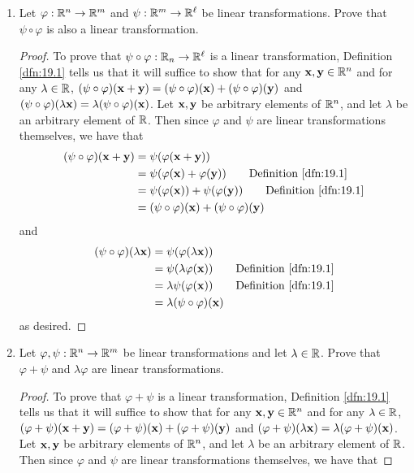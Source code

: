\documentclass[../main.tex]{subfiles}
\begin{document}
\begin{exercise}\label{exr:19.5}\leavevmode
    \begin{enumerate}[label={(\alph*)}]
        \item Let $\varphi:\mathbb{R}^n\to\mathbb{R}^m$ and $\psi:\mathbb{R}^m\to\mathbb{R}^\ell$ be linear transformations. Prove that $\psi\circ\varphi$ is also a linear transformation.
        \begin{proof}
            To prove that $\psi\circ\varphi:\mathbb{R}_n\to\mathbb{R}^\ell$ is a linear transformation, Definition \ref{dfn:19.1} tells us that it will suffice to show that for any $\mathbf{x},\mathbf{y}\in\mathbb{R}^n$ and for any $\lambda\in\mathbb{R}$, $(\psi\circ\varphi)(\mathbf{x}+\mathbf{y})=(\psi\circ\varphi)(\mathbf{x})+(\psi\circ\varphi)(\mathbf{y})$ and $(\psi\circ\varphi)(\lambda\mathbf{x})=\lambda(\psi\circ\varphi)(\mathbf{x})$. Let $\mathbf{x},\mathbf{y}$ be arbitrary elements of $\mathbb{R}^n$, and let $\lambda$ be an arbitrary element of $\mathbb{R}$. Then since $\varphi$ and $\psi$ are linear transformations themselves, we have that
            \begin{align*}
                (\psi\circ\varphi)(\x+\y) &= \psi(\varphi(\x+\y))\\
                &= \psi(\varphi(\x)+\varphi(\y))\tag*{Definition \ref{dfn:19.1}}\\
                &= \psi(\varphi(\x))+\psi(\varphi(\y))\tag*{Definition \ref{dfn:19.1}}\\
                &= (\psi\circ\varphi)(\x)+(\psi\circ\varphi)(\y)
            \end{align*}
            and
            \begin{align*}
                (\psi\circ\varphi)(\lambda\x) &= \psi(\varphi(\lambda\x))\\
                &= \psi(\lambda\varphi(\x))\tag*{Definition \ref{dfn:19.1}}\\
                &= \lambda\psi(\varphi(\x))\tag*{Definition \ref{dfn:19.1}}\\
                &= \lambda(\psi\circ\varphi)(\x)
            \end{align*}
            as desired.
        \end{proof}
        \item Let $\varphi,\psi:\mathbb{R}^n\to\mathbb{R}^m$ be linear transformations and let $\lambda\in\mathbb{R}$. Prove that $\varphi+\psi$ and $\lambda\varphi$ are linear transformations.
        \begin{proof}
            To prove that $\varphi+\psi$ is a linear transformation, Definition \ref{dfn:19.1} tells us that it will suffice to show that for any $\mathbf{x},\mathbf{y}\in\mathbb{R}^n$ and for any $\lambda\in\mathbb{R}$, $(\varphi+\psi)(\mathbf{x}+\mathbf{y})=(\varphi+\psi)(\mathbf{x})+(\varphi+\psi)(\mathbf{y})$ and $(\varphi+\psi)(\lambda\mathbf{x})=\lambda(\varphi+\psi)(\mathbf{x})$. Let $\mathbf{x},\mathbf{y}$ be arbitrary elements of $\mathbb{R}^n$, and let $\lambda$ be an arbitrary element of $\mathbb{R}$. Then since $\varphi$ and $\psi$ are linear transformations themselves, we have that

\end{proof}
\end{enumerate}
\end{exercise}
\end{document}
